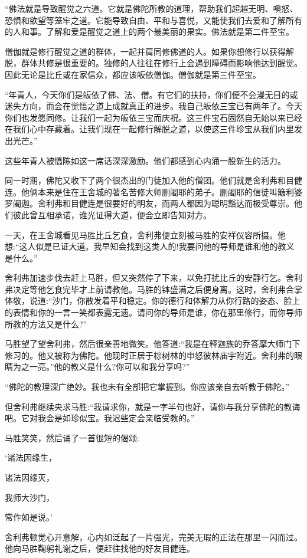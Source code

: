 \documentclass[12pt,twoside,openany]{book}
\begin{document}
“佛法就是导致醒觉之六道。它就是佛陀所教的道理，帮助我们超越无明、嗔怒、恐惧和欲望等笼牢之道。它能导致自由、平和与喜悦，又能使我们去爱和了解所有的人和事。了解和爱是醒觉之道上的两个最美丽的果实。佛法就是第二件至宝。

僧伽就是修行醒觉之道的群体，一起并肩同修佛道的人。如果你想修行以获得解脱，群体共修是很重要的。独修的人往往在修行上会遇到障碍而影响他达到醒觉。因此无论是比丘或在家信众，都应该皈依僧伽。僧伽就是第三件至宝。

“年青人，今天你们是皈依了佛、法、僧。有它们的扶持，你们便不会漫无目的或迷失方向，而会在觉悟之道上成就真正的进步。我自己皈依三宝已有两年了。今天你们也发愿同修。让我们一起为皈依三宝而庆祝。这三件宝石固然自无始以来已经在我们心中存藏着。让我们现在一起修行解脱之道，以使这三件珍宝从我们内里发出光芒。”

这些年青人被憍陈如这一席话深深激励。他们都感到心内涌一股新生的活力。

同一时期，佛陀又收下了两个很杰出的门徒加入他的僧团。他们就是舍利弗和目健连。他俩本来是住在王舍城的著名苦修大师删阇耶的弟子。删阇耶的信徒叫簸利婆罗阇迦。舍利弗和目健连是很要好的明友，而两人都因为聪明豁达而极受尊崇。他们彼此曾互相承诺，谁光证得大道，便会立即告知对方。

一天，在王舍城看见马胜比丘乞食，舍利弗便立刻被马胜的安祥仪容所摄。他想:“这人似是已证大道。我早知会找到这类人的!我要问他的导师是谁和他的教义是什么。”

舍利弗加速步伐去赶上马胜，但又突然停了下来，以免打扰比丘的安静行乞。舍利弗决定等他乞食完毕才上前请教他。马胜的钵盛满之后便身离。这时，舍利弗合掌体敬，说道:“沙门，你散发着平和稳定。你的德行和体解力从你行路的姿态、脸上的表情和你的一言一笑都表露无遗。请问你的导师是谁，你在那里修行，而你导师所教的方法又是什么?”

马胜望了望舍利弗，然后很亲善地微笑。他答道:“我是在释迦族的乔答摩大师门下修习的。他又被称为佛陀。他现时正居于棕树林的申怒彼林庙宇附近。舍利弗的眼睛为之一亮。”他的教义是什么?你可以和我分享吗?”

“佛陀的教理深广绝妙。我也未有全部把它掌握到。你应该亲自去听教于佛陀。”

但舍利弗继续央求马胜:“我请求你，就是一字半句也好，请你与我分享佛陀的教诲吧。它对我会是如珍似宝。我迟些定会亲临受教的。”

马胜笑笑，然后诵了一首很短的偈颂:

‘诸法因缘生，

诸法因缘灭，

我师大沙门，

常作如是说。’

舍利弗顿觉心开意解，心内如泛起了一片强光，完美无瑕的正法在那里一闪而过。他向马胜鞠躬礼谢之后，便赶往找他的好友目健连。
\end{document}
